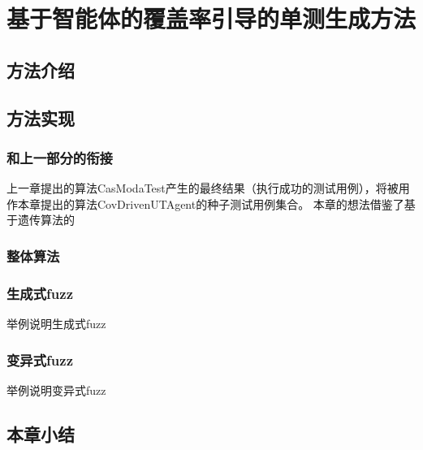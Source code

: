 \documentclass{book}
\begin{document}
\chapter{基于智能体的覆盖率引导的单测生成方法}
\section{方法介绍}
\section{方法实现}
\subsection{和上一部分的衔接}
上一章提出的算法CasModaTest产生的最终结果（执行成功的测试用例），将被用作本章提出的算法CovDrivenUTAgent的种子测试用例集合。
本章的想法借鉴了基于遗传算法的


\subsection{整体算法}



\subsection{生成式fuzz}
举例说明生成式fuzz
\subsection{变异式fuzz}
举例说明变异式fuzz
\section{本章小结}
\end{document}
